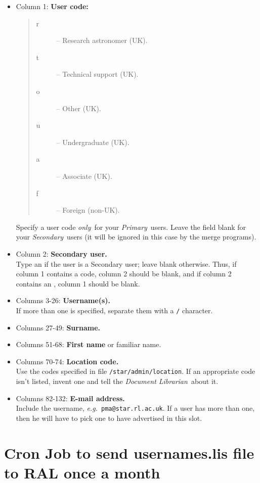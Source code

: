 \begin{itemize}
\begin{itemize}
\item Column 1: {\bf User code:}
 \begin{quote}
 \begin{description}
  \item [r] -- Research astronomer (UK).
  \item [t] -- Technical support (UK).
  \item [o] -- Other (UK).
  \item [u] -- Undergraduate (UK).
  \item [a] -- Associate (UK).
  \item [f] -- Foreign (non-UK).
 \end{description}
 \end{quote}
 Specify a user code {\em only}\, for your {\em Primary}\, users.
 Leave the field blank for your {\em Secondary}\, users (it will be ignored
 in this case by the merge programs).
\item Column 2: {\bf Secondary user.}\\
 Type an {\tt *} if the user is a Secondary user; leave blank otherwise.
 Thus, if column 1 contains a code, column 2 should be blank, and if column 2
 contains an {\tt *}, column 1 should be blank.
\item Columns 3-26: {\bf Username(s).}\\
 If more than one is specified, separate them with a {\tt /} character.
\item Columns 27-49: {\bf Surname.}
\item Columns 51-68: {\bf First name} or familiar name.
\item Columns 70-74: {\bf Location code.}\\
 Use the codes specified in file {\tt /star/admin/location}.
 If an appropriate code isn't listed, invent one and tell the
 {\em Document Librarian}\, about it.
\item Columns 82-132: {\bf E-mail address.}\\
 Include the username, {\em e.g.}\ {\tt pma@star.rl.ac.uk}.
 If a user has more than one, then he will have to pick one to have
 advertised in this slot.
\end{itemize}
\end{itemize}

\newpage

\section{\label{cronjob}Cron Job to send usernames.lis file to RAL once a month}

